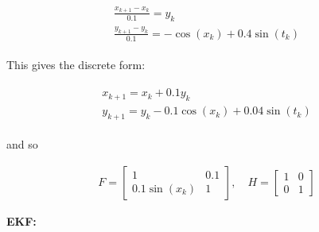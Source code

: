 \[\begin{aligned}
\begin{array}{l}\displaystyle\frac{x_{k+1} - x_k}{0.1} = y_k \\[3mm]
\displaystyle\frac{y_{k+1} - y_k}{0.1} = -\cos(x_k) + 0.4\sin(t_k)\end{array}
\end{aligned}\]

This gives the discrete form:

\[\begin{aligned}
\begin{array}{l}x_{k+1} = x_k + 0.1 y_k \\y_{k+1} = y_k -0.1\cos(x_k) + 0.04\sin(t_k)\end{array}
\end{aligned}\]

and so

\[\begin{aligned}
F = \begin{bmatrix} 1 & 0.1 \\ 0.1\sin(x_k) & 1 \end{bmatrix},  \quad
H = \begin{bmatrix} 1 & 0 \\ 0 & 1 \end{bmatrix}
\end{aligned}\]

\textbf{EKF:}

